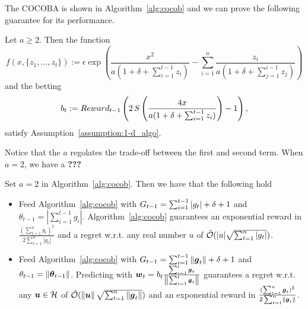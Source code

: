 The \ac{COCOBA} is shown in Algorithm~\ref{alg:cocob} and we can prove the following guarantee for its performance.
%
\begin{theorem}
\label{theo:cocob}
Let $a\geq2$. Then the function 
\[
f(x,\{z_1, \ldots, z_t\}) := \epsilon \exp\left(\frac{x^2}{a (1+\delta+\sum_{i=1}^{t-1} z_i)} - \sum_{i=1}^{n} \frac{z_i}{a( 1+\delta+\sum_{j=1}^{i-1} z_j) } \right)
\]
and the betting 
\[
b_t:= Reward_{t-1} \left(2 \, S\left(\frac{4 x}{a (1+\delta+\sum_{i=1}^{t-1} z_i)}\right)-1\right),
\]
satisfy Assumption~\ref{assumption:1-d_algo}.
% 
\end{theorem}
%
Notice that the $a$ regolates the trade-off between the first and second term. When $a=2$, we have a \textbf{???}

\begin{cor}
Set $a=2$ in Algorithm~\ref{alg:cocob}. Then we have that the following hold

\begin{itemize}
\item Feed Algorithm~\ref{alg:cocob} with $G_{t-1}=\sum_{i=1}^{t-1} |g_t| + \delta + 1$ and $\theta_{t-1}=|\sum_{i=1}^{t-1} g_i|$.
Algorithm~\ref{alg:cocob} guarantees an exponential reward in $\frac{(\sum_{t=1}^n g_t)^2}{2 \sum_{t=1}^n |g_t|}$ and a regret w.r.t. any real number $u$ of $\tilde{\mathcal{O}}(|u| \sqrt{\sum_{t=1}^n |g_t|})$.

\item Feed Algorithm~\ref{alg:cocob} with $G_{t-1}=\sum_{i=1}^{t-1} \left\|{\boldsymbol{g}_t}\right\| + \delta + 1$ and $\theta_{t-1}=\left\|{{\boldsymbol{\theta}}_{t-1}}\right\|$.
Predicting with $\boldsymbol{w}_t=b_t \frac{\sum_{i=1}^t \boldsymbol{g}_t}{\left\|{\sum_{i=1}^t \boldsymbol{g}_t}\right\|}$ guarantees a regret w.r.t. any $\boldsymbol{u} \in \mathcal{H}$ of $\tilde{\mathcal{O}}(\left\|{\boldsymbol{u}}\right\| \sqrt{\sum_{t=1}^n \left\|{\boldsymbol{g}_t}\right\|})$ and an exponential reward in $\frac{(\sum_{t=1}^n \boldsymbol{g}_t)^2}{2 \sum_{t=1}^n \left\|{\boldsymbol{g}_t}\right\|}$.

\end{itemize}
\end{cor}